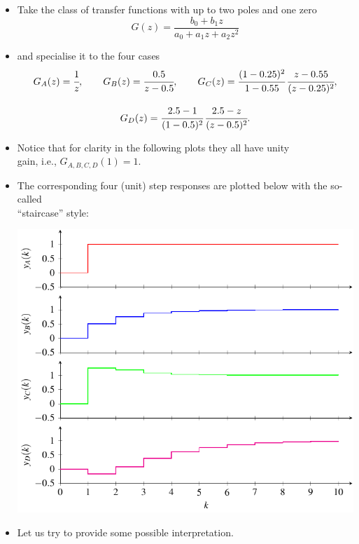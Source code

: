 \begin{frame}
\myPause
 \begin{itemize}[<+-| alert@+>]
 \item Take the class of transfer functions with up to two poles and one zero
       \begin{displaymath}
        G(z) = \frac{b_0+b_1z}{a_0+a_1z+a_2z^2}
       \end{displaymath}
 \item and specialise it to the four cases
       \begin{displaymath}
        \begin{array}{c}
         G_A(z) = \cfrac{1}{z}, \qquad
         G_B(z) = \cfrac{0.5}{z-0.5}, \qquad
         G_C(z) = \cfrac{(1-0.25)^2}{1-0.55} \, \cfrac{z-0.55}{(z-0.25)^2}, \\ \\
         G_D(z) = \cfrac{2.5-1}{(1-0.5)^2} \, \cfrac{2.5-z}{(z-0.5)^2}.
        \end{array}
       \end{displaymath}
 \item Notice that for clarity in the following plots they all have unity\\
       gain, i.e., $G_{A,B,C,D}(1)=1$.
 \end{itemize}
\end{frame}

\begin{frame}
\myPause
 \begin{itemize}[<+-| alert@+>]
 \item The corresponding four (unit) step responses are plotted below with the so-called\\
       ``staircase'' style:
       \begin{center}
        \includegraphics[width=0.50\columnwidth]{./Unit-04/img/StepRespTypes.pdf}
       \end{center}
 \item \vspace{-3mm} Let us try to provide some possible interpretation.
 \end{itemize}
\end{frame}


